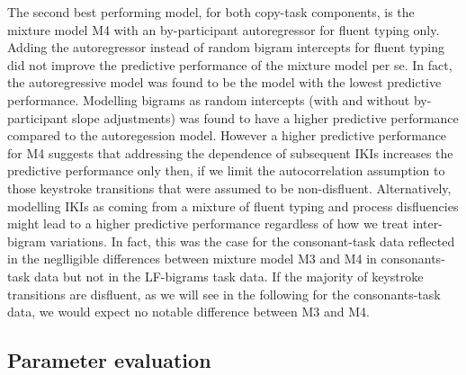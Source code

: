 \documentclass[
  english,
  man,mask,floatsintext]{apa7}
\begin{document}
The second best performing model, for both copy-task components, is the mixture model M4 with an by-participant autoregressor for fluent typing only. Adding the autoregressor instead of random bigram intercepts for fluent typing did not improve the predictive performance of the mixture model per se. In fact, the autoregressive model was found to be the model with the lowest predictive performance. Modelling bigrams as random intercepts (with and without by-participant slope adjustments) was found to have a higher predictive performance compared to the autoregession model. However a higher predictive performance for M4 suggests that addressing the dependence of subsequent IKIs increases the predictive performance only then, if we limit the autocorrelation assumption to those keystroke transitions that were assumed to be non-disfluent. Alternatively, modelling IKIs as coming from a mixture of fluent typing and process disfluencies might lead to a higher predictive performance regardless of how we treat inter-bigram variations. In fact, this was the case for the consonant-task data reflected in the neglligible differences between mixture model M3 and M4 in consonants-task data but not in the LF-bigrams task data. If the majority of keystroke transitions are disfluent, as we will see in the following for the consonants-task data, we would expect no notable difference between M3 and M4.

\hypertarget{parameter-evaluation}{%
\subsection{Parameter evaluation}\label{parameter-evaluation}}
\end{document}
